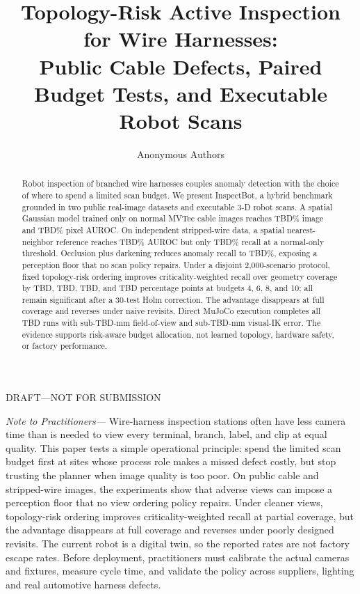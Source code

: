 \documentclass[journal]{IEEEtran}
\title{Topology-Risk Active Inspection for Wire Harnesses:\\
Public Cable Defects, Paired Budget Tests, and Executable Robot Scans}
\author{Anonymous Authors}
\date{}
\newcommand{\draftwarning}{\textcolor{draftred}{DRAFT---NOT FOR SUBMISSION}}
\newcommand{\MVTecSpatialAUROC}{TBD}
\newcommand{\MVTecPixelAUROC}{TBD}
\newcommand{\WireNNAUROC}{TBD}
\newcommand{\WireNNRecall}{TBD}
\newcommand{\WorstViewRecall}{TBD}
\newcommand{\DeployDeltaBFour}{TBD}
\newcommand{\DeployDeltaBSix}{TBD}
\newcommand{\DeployDeltaBEight}{TBD}
\newcommand{\DeployDeltaBTen}{TBD}
\newcommand{\MuJoCoRuns}{TBD}
\newcommand{\MuJoCoFOVmm}{TBD}
\newcommand{\MuJoCoIKmm}{TBD}
\begin{document}
\maketitle

\begin{center}
\draftwarning
\end{center}

\begin{abstract}
Robot inspection of branched wire harnesses couples anomaly detection with the
choice of where to spend a limited scan budget. We present InspectBot, a hybrid
benchmark grounded in two public real-image datasets and executable 3-D robot
scans. A spatial Gaussian model trained only on normal MVTec cable images reaches
\MVTecSpatialAUROC\% image and \MVTecPixelAUROC\% pixel AUROC. On independent
stripped-wire data, a spatial nearest-neighbor reference reaches
\WireNNAUROC\% AUROC but only \WireNNRecall\% recall at a normal-only threshold.
Occlusion plus darkening reduces anomaly recall to \WorstViewRecall\%, exposing
a perception floor that no scan policy repairs. Under a disjoint 2,000-scenario
protocol, fixed topology-risk ordering improves criticality-weighted recall over
geometry coverage by \DeployDeltaBFour, \DeployDeltaBSix, \DeployDeltaBEight,
and \DeployDeltaBTen{} percentage points at budgets 4, 6, 8, and 10; all remain
significant after a 30-test Holm correction. The advantage disappears at full
coverage and reverses under naive revisits. Direct MuJoCo execution completes
all \MuJoCoRuns{} runs with sub-\MuJoCoFOVmm{}-mm field-of-view and
sub-\MuJoCoIKmm{}-mm visual-IK error. The evidence supports risk-aware budget
allocation, not learned topology, hardware safety, or factory performance.
\end{abstract}

\noindent\textit{Note to Practitioners---}
Wire-harness inspection stations often have less camera time than is needed to
view every terminal, branch, label, and clip at equal quality. This paper tests
a simple operational principle: spend the limited scan budget first at sites
whose process role makes a missed defect costly, but stop trusting the planner
when image quality is too poor. On public cable and stripped-wire images, the
experiments show that adverse views can impose a perception floor that no view
ordering policy repairs. Under cleaner views, topology-risk ordering improves
criticality-weighted recall at partial coverage, but the advantage disappears
at full coverage and reverses under poorly designed revisits. The current robot
is a digital twin, so the reported rates are not factory escape rates. Before
deployment, practitioners must calibrate the actual cameras and fixtures,
measure cycle time, and validate the policy across suppliers, lighting and real
automotive harness defects.
\end{document}
